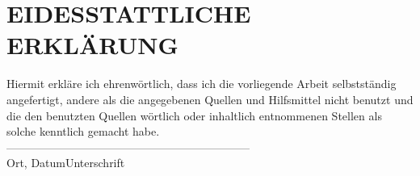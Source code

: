 \newpage
\section*{EIDESSTATTLICHE ERKLÄRUNG}
\vspace{6cm}
Hiermit erkläre ich ehrenwörtlich, dass ich die vorliegende Arbeit selbstständig angefertigt, andere als die angegebenen Quellen und Hilfsmittel nicht benutzt und die den benutzten Quellen wörtlich oder inhaltlich entnommenen Stellen als solche kenntlich gemacht habe.
\vspace{3cm}
\\
---------------------------------------\hspace*{4cm}--------------------------
\\\hspace*{1.5cm}Ort, Datum\hspace*{6.15cm}Unterschrift
